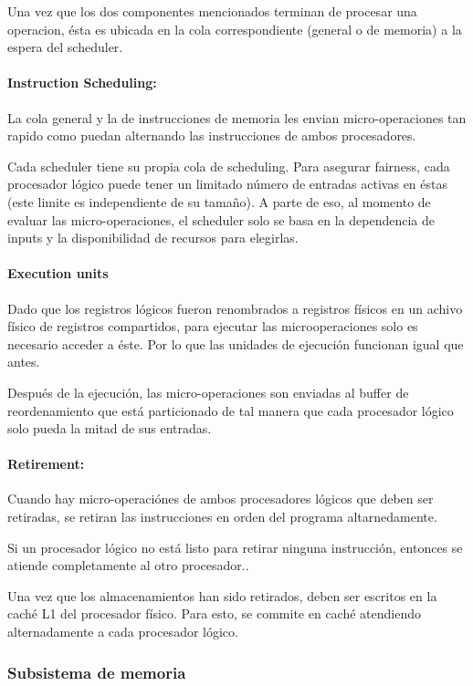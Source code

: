 Una vez que los dos componentes mencionados terminan de procesar una operacion, ésta es ubicada en la cola correspondiente (general o de memoria) a la espera del scheduler.

\paragraph{Instruction Scheduling:} 
La cola general y la de instrucciones de memoria les envian micro-operaciones tan rapido como puedan alternando las instrucciones de ambos procesadores.

Cada scheduler tiene su propia cola de scheduling. Para  asegurar fairness, cada procesador lógico puede tener un limitado número de entradas activas en éstas (este limite es independiente de su tamaño). A parte de eso, al momento de evaluar las micro-operaciones, el scheduler solo se basa en la dependencia de inputs y la disponibilidad de recursos para elegirlas.

\paragraph{Execution units}
Dado que los registros lógicos fueron renombrados a registros físicos en un achivo físico de registros compartidos, para ejecutar las microoperaciones solo es necesario acceder a éste. Por lo que las unidades de ejecución funcionan igual que antes.

Después de la ejecución, las micro-operaciones son enviadas al buffer de reordenamiento que está particionado de tal manera que cada procesador lógico solo pueda la mitad de sus entradas.

\paragraph{Retirement:} Cuando hay micro-operaciónes de ambos procesadores lógicos que deben ser retiradas, se  retiran las instrucciones en orden del programa altarnedamente.

Si un procesador lógico no está listo para retirar ninguna instrucción, entonces se atiende completamente al otro procesador..

Una vez que los almacenamientos han sido retirados, deben ser escritos en la caché L1 del procesador físico. Para esto, se commite en caché atendiendo alternadamente a cada procesador lógico.

\subsubsection{Subsistema de memoria}

